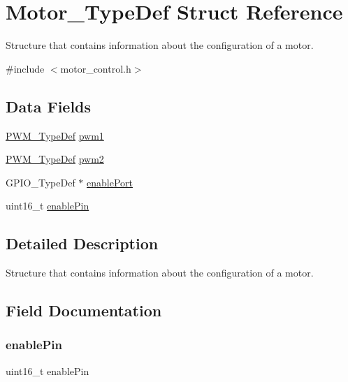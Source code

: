 \hypertarget{struct_motor___type_def}{}\section{Motor\+\_\+\+Type\+Def Struct Reference}
\label{struct_motor___type_def}


Structure that contains information about the configuration of a motor.  




{\ttfamily \#include $<$motor\+\_\+control.\+h$>$}

\subsection*{Data Fields}
\begin{DoxyCompactItemize}
\item 
\hyperlink{struct_p_w_m___type_def}{P\+W\+M\+\_\+\+Type\+Def} \hyperlink{struct_motor___type_def_ab6053993e6628cef7e5e202a05e6a0ac}{pwm1}
\item 
\hyperlink{struct_p_w_m___type_def}{P\+W\+M\+\_\+\+Type\+Def} \hyperlink{struct_motor___type_def_afa92ea5c8db1b225b1c718099f986b8e}{pwm2}
\item 
G\+P\+I\+O\+\_\+\+Type\+Def $\ast$ \hyperlink{struct_motor___type_def_a0ed3538ba41cbf1643d12a76b8fcf6e1}{enable\+Port}
\item 
uint16\+\_\+t \hyperlink{struct_motor___type_def_aa334426c266c14b33d04af6e7da3b861}{enable\+Pin}
\end{DoxyCompactItemize}


\subsection{Detailed Description}
Structure that contains information about the configuration of a motor. 

\subsection{Field Documentation}
\mbox{\label{struct_motor___type_def_aa334426c266c14b33d04af6e7da3b861}} 
\subsubsection{\texorpdfstring{enable\+Pin}{enablePin}}
{\footnotesize\ttfamily uint16\+\_\+t enable\+Pin}

